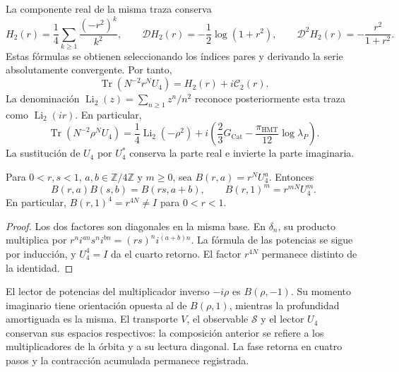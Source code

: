 La componente real de la misma traza conserva
\[
 H_2(r)=\frac14\sum_{k\geq1}\frac{(-r^2)^k}{k^2},
 \qquad
 \mathcal D H_2(r)=-\frac12\log(1+r^2),\qquad
 \mathcal D^2H_2(r)=-\frac{r^2}{1+r^2}.
\]
Estas fórmulas se obtienen seleccionando los índices pares y
derivando la serie absolutamente convergente. Por tanto,
\[
 \operatorname{Tr}(N^{-2}r^NU_4)=H_2(r)+i\mathcal C_2(r).
\]
La denominación
\(\operatorname{Li}_2(z)=\sum_{n\geq1}z^n/n^2\)
reconoce posteriormente esta traza como
\(\operatorname{Li}_2(ir)\). En particular,
\[
 \operatorname{Tr}(N^{-2}\rho^NU_4)
 =\frac14\operatorname{Li}_2(-\rho^2)
  +i\left(\frac23G_{\mathrm{Cat}}
       -\frac{\pi_{\mathrm{HMT}}}{12}\log\lambda_P\right).
\]
La sustitución de \(U_4\) por \(U_4^*\) conserva la parte
real e invierte la parte imaginaria.

\begin{proposition}
\label{corpus9:iv:pell-composicion}
Para \(0<r,s<1\), \(a,b\in\mathbb Z/4\mathbb Z\) y \(m\geq0\), sea
\(B(r,a)=r^NU_4^a\). Entonces
\[
 B(r,a)B(s,b)=B(rs,a+b),\qquad
 B(r,1)^m=r^{mN}U_4^m.
\]
En particular, \(B(r,1)^4=r^{4N}\ne I\) para \(0<r<1\).
\end{proposition}
\begin{proof}
Los dos factores son diagonales en la misma base. En
\(\delta_n\), su producto multiplica por
\(r^ni^{an}s^ni^{bn}=(rs)^ni^{(a+b)n}\).
La fórmula de las potencias se sigue por inducción, y
\(U_4^4=I\) da el cuarto retorno. El factor
\(r^{4N}\) permanece distinto de la identidad.
\end{proof}

El lector de potencias del multiplicador inverso
\(-i\rho\) es \(B(\rho,-1)\). Su momento imaginario tiene
orientación opuesta al de \(B(\rho,1)\), mientras la
profundidad amortiguada es la misma. El transporte \(V\),
el observable \(\mathscr S\) y el lector \(U_4\) conservan
sus espacios respectivos: la composición anterior se refiere
a los multiplicadores de la órbita y a su lectura diagonal.
La fase retorna en cuatro pasos y la contracción acumulada
permanece registrada.
